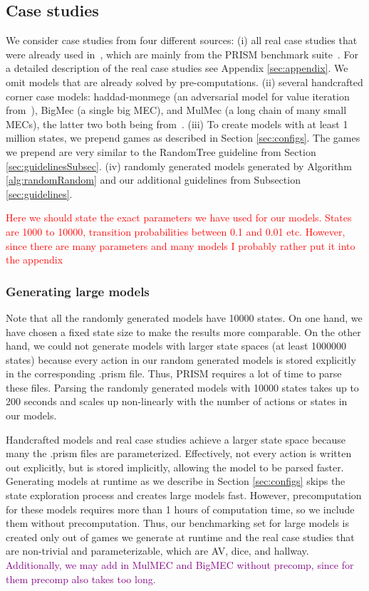 \subsection{Case studies}
We consider case studies from four different sources: 
(i) all real case studies that were already used in~\cite{gandalf}, which are mainly from the PRISM benchmark suite~\cite{PRISMben}.
For a detailed description of the real case studies see Appendix \ref{sec:appendix}.
We omit models that are already solved by pre-computations.
(ii) several handcrafted corner case models: haddad-monmege (an adversarial model for value iteration from~\cite{haddadmonmege}), BigMec (a single big MEC), and MulMec (a long chain of many small MECs), the latter two both being from~\cite{gandalf}.
(iii) To create models with at least 1 million states, we prepend games as described in Section \ref{sec:configs}.
The games we prepend are very similar to the RandomTree guideline from Section \ref{sec:guidelinesSubsec}.
(iv) randomly generated models generated by Algorithm \ref{alg:randomRandom} and our additional guidelines from Subsection \ref{sec:guidelines}.

\textcolor{red}{Here we should state the exact parameters we have used for our models. States are 1000 to 10000, transition probabilities between 0.1 and 0.01 etc.
However, since there are many parameters and many models I probably rather put it into the appendix}

\subsubsection*{Generating large models}
Note that all the randomly generated models have 10000 states. On one hand, we have chosen a fixed state size to make the results more comparable.
On the other hand, we could not generate models with larger state spaces (at least 1000000 states) because every action in our random generated models is stored explicitly
in the corresponding .prism file. Thus, PRISM requires a lot of time to parse these files. Parsing the randomly generated models with 10000 states takes
up to 200 seconds and scales up non-linearly with the number of actions or states in our models.

Handcrafted models and real case studies achieve a larger state space because many the .prism files are parameterized.
Effectively, not every action is written out explicitly, but is stored implicitly, allowing the model to be parsed faster.
Generating models at runtime as we describe in Section \ref{sec:configs} skips the state exploration process and 
creates large models fast. However, precomputation for these models requires more than 1 hours of computation time, so we include them without precomputation.
Thus, our benchmarking set for large models is created only out of games we generate at runtime and the real case studies that are non-trivial and parameterizable, 
which are AV, dice, and hallway. \textcolor{purple}{Additionally, we may add in MulMEC and BigMEC without precomp, since for them precomp also takes too long.}

